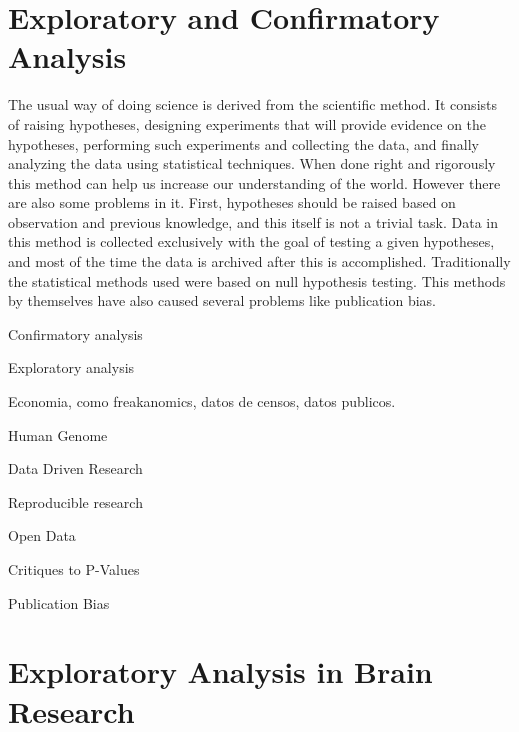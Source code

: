 
\section{Exploratory and Confirmatory Analysis}

The usual way of doing science is derived from the scientific method. It consists of raising hypotheses, designing experiments that will provide evidence on the hypotheses, performing such experiments and collecting the data, and finally analyzing the data using statistical techniques. When done right and rigorously this method can help us increase our understanding of the world. However there are also some problems in it. First, hypotheses should be raised based on observation and previous knowledge, and this itself is not a trivial task. Data in this method is collected exclusively with the goal of testing a given hypotheses, and most of the time the data is archived after this is accomplished. Traditionally the statistical methods used were based on null hypothesis testing. This methods by themselves have also caused several problems like publication bias\autocite{}.  


Confirmatory analysis

Exploratory analysis

Economia, como freakanomics, datos de censos, datos publicos.

Human Genome

Data Driven Research

Reproducible research

Open Data

Critiques to P-Values

Publication Bias



\section{Exploratory Analysis in Brain Research}


